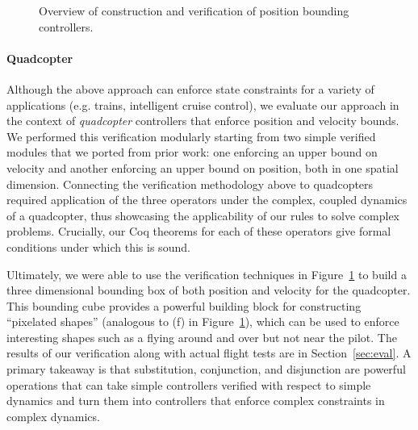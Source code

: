 \begin{figure}[t]

     \caption{Overview of construction and verification of position bounding controllers.}
     \label{fig:library}
\end{figure}

\paragraph*{Quadcopter}
Although the above approach can enforce state constraints for a variety of
applications (e.g. trains, intelligent cruise control), we evaluate our
approach in the context of \emph{quadcopter} controllers that enforce
position and velocity bounds.  We performed this verification modularly
starting from two simple verified modules that we ported from prior work:
one enforcing an upper bound on velocity and another enforcing an upper
bound on position, both in one spatial dimension.  Connecting the
verification methodology above to quadcopters required application of the
three operators under the complex, coupled dynamics of a quadcopter, thus
showcasing the applicability of our rules to solve complex problems.
Crucially, our Coq theorems for each of these operators give formal
conditions under which this is sound.

Ultimately, we were able to use the verification techniques in
Figure~\ref{fig:library} to build a three dimensional bounding box of both
position and velocity for the quadcopter.  This bounding cube provides a
powerful building block for constructing ``pixelated shapes'' (analogous to
(f) in Figure~\ref{fig:library}), which can be used to enforce interesting
shapes such as a flying around and over but not near the pilot.  The
results of our verification along with actual flight tests are in
Section~\ref{sec:eval}.  A primary takeaway is that substitution,
conjunction, and disjunction are powerful operations that can take simple
controllers verified with respect to simple dynamics and turn them into
controllers that enforce complex constraints in complex dynamics.

